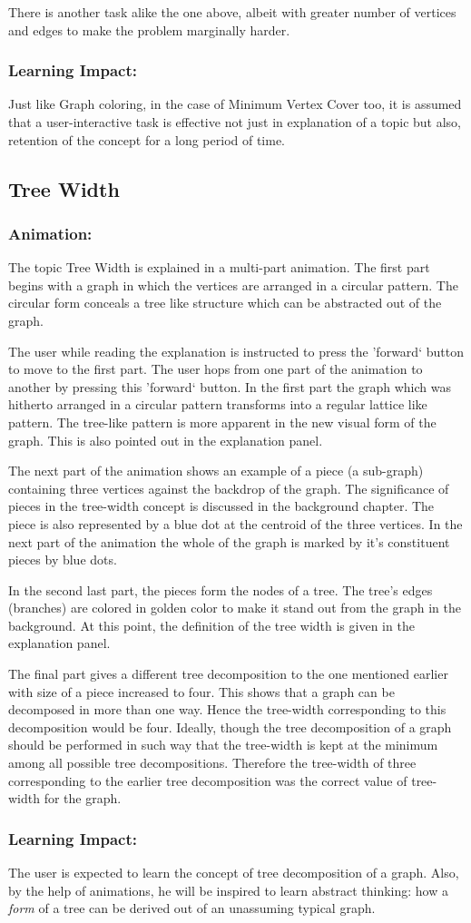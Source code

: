 There is another task alike the one above, albeit with greater
number of vertices and edges to make the problem marginally harder.

\subsubsection{Learning Impact:}
Just like Graph coloring, in the case of Minimum Vertex Cover too, it is
assumed that a user-interactive task is effective not just in explanation of a
topic but also, retention of the concept for a long period of time.

\subsection{Tree Width}
\subsubsection{Animation:}
The topic Tree Width is explained in a multi-part animation. The first part
begins with a graph in which the vertices are arranged in a circular pattern.
The circular form conceals a tree like structure which can be abstracted out of
the graph. 

The user while reading the explanation is instructed to press the 'forward`
button to move to the first part. The user hops from one part of the animation
to another by pressing this 'forward` button.  In the first part the graph
which was hitherto arranged in a circular pattern transforms into a regular
lattice like pattern. The tree-like pattern is more apparent in the new visual
form of the graph.  This is also pointed out in the explanation panel.  

The next part of the animation shows an example of a piece (a sub-graph)
containing three vertices against the backdrop of the graph. The significance
of pieces in the tree-width concept is discussed in the background chapter.
The piece is also represented by a blue dot at the centroid of the three
vertices. In the next part of the animation the whole of the graph is marked by
it's constituent pieces by blue dots. 

In the second last part, the pieces form the nodes of a tree. The tree's edges
(branches) are colored in golden color to make it stand out from the graph in
the background. At this point, the definition of the tree width is given in
the explanation panel.

The final part gives a different tree decomposition to the one mentioned
earlier with size of a piece increased to four. This shows that a graph can be
decomposed in more than one way. Hence the tree-width corresponding to this
decomposition would be four. Ideally, though the tree decomposition of a graph
should be performed in such way that the tree-width is kept at the minimum
among all possible tree decompositions. Therefore the tree-width of three
corresponding to the earlier tree decomposition was the correct value of
tree-width for the graph.

\subsubsection{Learning Impact:}
The user is expected to learn the concept of tree decomposition of a graph.
Also, by the help of animations, he will be inspired to learn abstract
thinking: how a \emph{form} of a tree can be derived out of an unassuming
typical graph.
